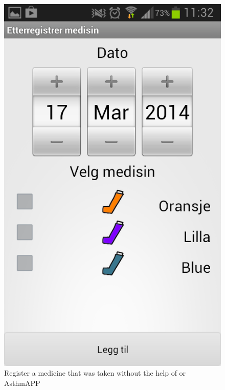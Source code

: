 \begin{figure}
\begin{minipage}[t]{0.4\linewidth}
			\includegraphics[width=0.20\paperwidth]{Pictures/new-screenshots/register-medicine-taken.png}
		\caption[Register medicine taken]{Register a medicine that was taken without the help of \buddy{} or AsthmAPP}
		\label{fig:register_medicine_taken}
	\end{minipage}
		\begin{minipage}[t]{0.4\linewidth}
		\centering

\end{minipage}
\end{figure}
